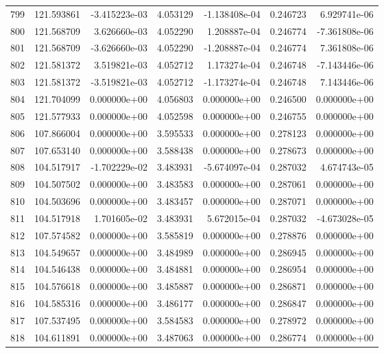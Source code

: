 \begin{tabular}{rrrrrrr}
 799 & 121.593861 & -3.415223e-03 &  4.053129 & -1.138408e-04 &    0.246723 &  6.929741e-06 \\
 800 & 121.568709 &  3.626660e-03 &  4.052290 &  1.208887e-04 &    0.246774 & -7.361808e-06 \\
 801 & 121.568709 & -3.626660e-03 &  4.052290 & -1.208887e-04 &    0.246774 &  7.361808e-06 \\
 802 & 121.581372 &  3.519821e-03 &  4.052712 &  1.173274e-04 &    0.246748 & -7.143446e-06 \\
 803 & 121.581372 & -3.519821e-03 &  4.052712 & -1.173274e-04 &    0.246748 &  7.143446e-06 \\
 804 & 121.704099 &  0.000000e+00 &  4.056803 &  0.000000e+00 &    0.246500 &  0.000000e+00 \\
 805 & 121.577933 &  0.000000e+00 &  4.052598 &  0.000000e+00 &    0.246755 &  0.000000e+00 \\
 806 & 107.866004 &  0.000000e+00 &  3.595533 &  0.000000e+00 &    0.278123 &  0.000000e+00 \\
 807 & 107.653140 &  0.000000e+00 &  3.588438 &  0.000000e+00 &    0.278673 &  0.000000e+00 \\
 808 & 104.517917 & -1.702229e-02 &  3.483931 & -5.674097e-04 &    0.287032 &  4.674743e-05 \\
 809 & 104.507502 &  0.000000e+00 &  3.483583 &  0.000000e+00 &    0.287061 &  0.000000e+00 \\
 810 & 104.503696 &  0.000000e+00 &  3.483457 &  0.000000e+00 &    0.287071 &  0.000000e+00 \\
 811 & 104.517918 &  1.701605e-02 &  3.483931 &  5.672015e-04 &    0.287032 & -4.673028e-05 \\
 812 & 107.574582 &  0.000000e+00 &  3.585819 &  0.000000e+00 &    0.278876 &  0.000000e+00 \\
 813 & 104.549657 &  0.000000e+00 &  3.484989 &  0.000000e+00 &    0.286945 &  0.000000e+00 \\
 814 & 104.546438 &  0.000000e+00 &  3.484881 &  0.000000e+00 &    0.286954 &  0.000000e+00 \\
 815 & 104.576618 &  0.000000e+00 &  3.485887 &  0.000000e+00 &    0.286871 &  0.000000e+00 \\
 816 & 104.585316 &  0.000000e+00 &  3.486177 &  0.000000e+00 &    0.286847 &  0.000000e+00 \\
 817 & 107.537495 &  0.000000e+00 &  3.584583 &  0.000000e+00 &    0.278972 &  0.000000e+00 \\
 818 & 104.611891 &  0.000000e+00 &  3.487063 &  0.000000e+00 &    0.286774 &  0.000000e+00 \\

\end{tabular}
